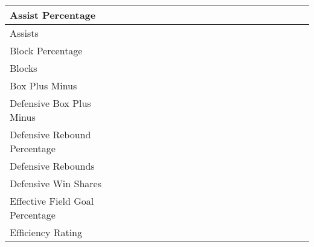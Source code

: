 \documentclass{article}
\def \cm{\checkmark}
\begin{document}
\begin{table}[ht]
\begin{tabular}{lccccccccccccccccccccc}
            \midrule
            Assist Percentage                   &     &     &     &     &     &     &     &     &     &     & \cm & \cm & \cm & \cm & \cm & \cm & \cm & \cm & \cm & \cm & \cm \\
            \midrule
            Assists                             & \cm & \cm & \cm & \cm & \cm & \cm & \cm & \cm & \cm & \cm & \cm & \cm & \cm & \cm & \cm & \cm & \cm & \cm & \cm & \cm & \cm \\
            \midrule
            Block Percentage                    &     &     &     &     &     &     &     &     &     &     &     &     &     & \cm & \cm & \cm & \cm & \cm & \cm & \cm & \cm \\
            \midrule
            Blocks                              &     &     &     &     &     &     &     &     &     &     &     &     & \cm & \cm & \cm & \cm & \cm & \cm & \cm & \cm & \cm \\
            \midrule
            Box Plus Minus                      &     &     &     &     &     &     &     &     &     &     &     &     & \cm & \cm & \cm & \cm & \cm & \cm & \cm & \cm & \cm \\
            \midrule
            Defensive Box Plus Minus            &     &     &     &     &     &     &     &     &     &     &     &     & \cm & \cm & \cm & \cm & \cm & \cm & \cm & \cm & \cm \\
            \midrule
            Defensive Rebound Percentage        &     &     &     &     &     &     &     &     &     &     &     &     &     & \cm & \cm & \cm & \cm & \cm & \cm & \cm & \cm \\
            \midrule
            Defensive Rebounds                  &     &     &     &     &     &     &     &     &     &     &     &     & \cm & \cm & \cm & \cm & \cm & \cm & \cm & \cm & \cm \\
            \midrule
            Defensive Win Shares                &     &     & \cm & \cm & \cm & \cm & \cm & \cm & \cm & \cm & \cm & \cm & \cm & \cm & \cm & \cm & \cm & \cm & \cm & \cm & \cm \\
            \midrule
            Effective Field Goal Percentage     &     &     &     &     & \cm & \cm & \cm & \cm & \cm & \cm & \cm & \cm & \cm & \cm & \cm & \cm & \cm & \cm & \cm & \cm & \cm \\
            \midrule
            Efficiency Rating                   &     &     &     &     &     &     &     &     & \cm & \cm & \cm & \cm & \cm & \cm & \cm & \cm & \cm & \cm & \cm & \cm & \cm \\

\end{tabular}
\end{table}
\end{document}
